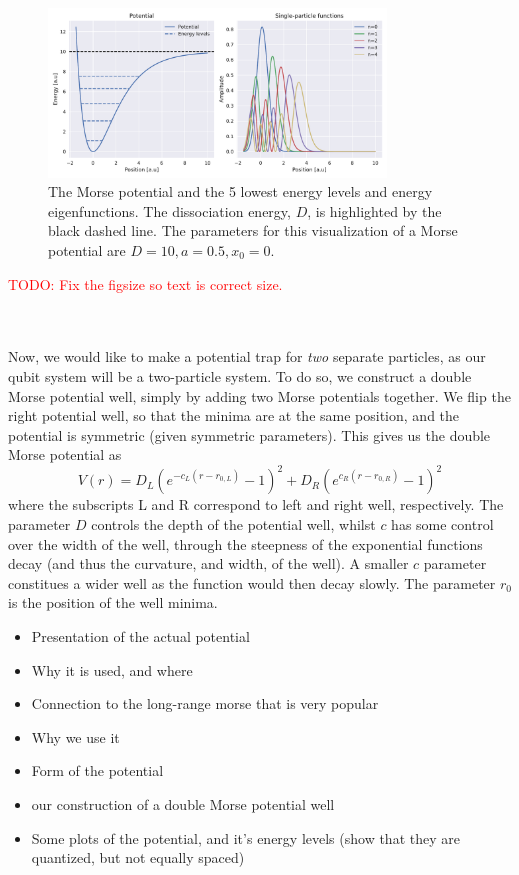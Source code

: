\documentclass{subfiles}
\begin{document}
\begin{figure}
    \centering
    \includegraphics[width=0.8\textwidth]{figs/potential_spf.pdf}
    \caption{The Morse potential and the 5 lowest energy levels and energy eigenfunctions. The dissociation energy, $D$, is highlighted by the black dashed line. The parameters for this visualization of a Morse potential are $D=10, a=0.5, x_0=0$.}
    \label{fig:morse_potential}
\end{figure}
\textcolor{red}{TODO: Fix the figsize so text is correct size.}

\\ \\
Now, we would like to make a potential trap for \emph{two} separate particles, as our qubit system will be a two-particle system. To do so, we construct a double Morse potential well, simply by adding two Morse potentials together. We flip the right potential well, so that the minima are at the same position, and the potential is symmetric (given symmetric parameters). This gives us the double Morse potential as
\begin{equation}
    V(r) = D_L(e^{-c_L(r-r_{0,L})} - 1)^2 + D_R(e^{c_R(r-r_{0,R})} - 1)^2
\end{equation}
where the subscripts L and R correspond to left and right well, respectively. The parameter $D$ controls the depth of the potential well, whilst $c$ has some control over the width of the well, through the steepness of the exponential functions decay (and thus the curvature, and width, of the well). A smaller $c$ parameter constitues a wider well as the function would then decay slowly. The parameter $r_0$ is the position of the well minima. 

\begin{itemize}
    \item Presentation of the actual potential
    \item Why it is used, and where
    \item Connection to the long-range morse that is very popular
    \item Why we use it
    \item Form of the potential
    \item our construction of a double Morse potential well
    \item Some plots of the potential, and it's energy levels (show that they are quantized, but not equally spaced)
\end{itemize}
\end{document}
